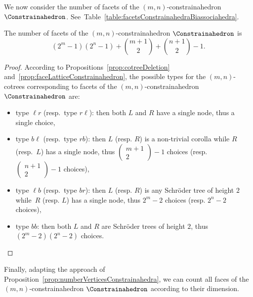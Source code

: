 \documentclass[AHL,Unicode,longabstracts,published]{cedram}
\begin{document}
We now consider the number of facets of the $(m,n)$-constrainahedron $\Constrainahedron$. See~Table~\ref{table:facetsConstrainahedraBiassociahedra}.

\begin{prop}\label{prop:numberFacetsConstrainahedra}
The number of facets of the $(m,n)$-constrainahedron \linebreak $\Constrainahedron$ is
\[
\textstyle{ \left(2^m-1\right)\left(2^n-1\right) + \binom{m+1}{2} + \binom{n+1}{2} - 1.}
\]
\end{prop}

\begin{proof}
According to Propositions~\ref{prop:cotreeDeletion} and~\ref{prop:faceLatticeConstrainahedron}, the possible types for the $(m,n)$-cotrees corresponding to facets of the $(m,n)$-constrainahedron $\Constrainahedron$ are:
\begin{itemize}
\item type $\ell r$ (resp.~type $r\ell$): then both $L$ and $R$ have a single node, thus a single choice,
\item type $b\ell$ (resp.~type $rb$): then $L$ (resp. $R$) is a non-trivial corolla while $R$ (resp.~$L$) has a single node, thus $(\begin{smallmatrix}m+1\\2\end{smallmatrix})-1$ choices (resp. $(\begin{smallmatrix}n+1\\2\end{smallmatrix})-1$ choices),
\item type $\ell b$ (resp.~type $br$): then $L$ (resp. $R$) is any Schr\"oder tree of height $2$ while~$R$ (resp. $L$) has a single node, thus $2^m-2$ choices (resp. $2^n-2$ choices),
\item type $bb$: then both $L$ and $R$ are Schr\"oder trees of height $2$, thus $(2^m-2)(2^n-2)$ choices.
\qedhere
\end{itemize}
\end{proof}

Finally, adapting the approach of Proposition~\ref{prop:numberVerticesConstrainahedra}, we can count all faces of the $(m,n)$-constraina\-hedron $\Constrainahedron$ according to their dimension.
\end{document}
